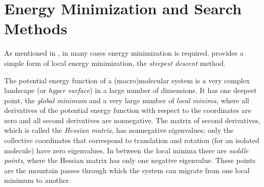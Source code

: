 \section{Energy Minimization and Search Methods}

As mentioned in , in many cases energy
minimization is required. {\gromacs} provides a simple form of local
energy minimization, the {\em steepest descent} method.

The potential energy function of a (macro)molecular system is a very
complex landscape (or {\em hyper surface}) in a large number of
dimensions. It has one deepest point, the {\em global minimum} and a
very large number of {\em local minima}, where all derivatives of the
potential energy function with respect to the coordinates are zero and
all second derivatives are nonnegative. The matrix of second
derivatives, which is called the {\em Hessian matrix}, has nonnegative
eigenvalues; only the collective coordinates that correspond to
translation and rotation (for an isolated molecule) have zero
eigenvalues. In between the local minima there are {\em saddle
points}, where the Hessian matrix has only one negative
eigenvalue. These points are the mountain passes through which the
system can migrate from one local minimum to another.

